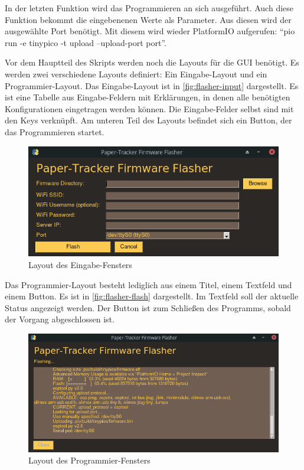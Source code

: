 In der letzten Funktion wird das Programmieren an sich ausgeführt.
Auch diese Funktion bekommt die eingebenenen Werte als Parameter. Aus diesen wird der ausgewählte Port benötigt.
Mit diesem wird wieder PlatformIO aufgerufen: \enquote{pio run -e tinypico -t upload --upload-port port}.

Vor dem Hauptteil des Skripts werden noch die Layouts für die \gls{GUI} benötigt.
Es werden zwei verschiedene Layouts definiert: Ein Eingabe-Layout und ein Programmier-Layout.
Das Eingabe-Layout ist in \autoref{fig:flasher-input} dargestellt.
Es ist eine Tabelle aus Eingabe-Feldern mit Erklärungen, in denen alle benötigten Konfigurationen eingetragen werden können.
Die Eingabe-Felder selbst sind mit den Keys verknüpft.
Am unteren Teil des Layouts befindet sich ein Button, der das Programmieren startet.

\begin{figure}[htbp]
	\includegraphics[width=\textwidth]{images/flasher/input.png}
	\centering
	\caption{Layout des Eingabe-Fensters}
	\label{fig:flasher-input}
\end{figure}

Das Programmier-Layout besteht lediglich aus einem Titel, einem Textfeld und einem Button.
Es ist in \autoref{fig:flasher-flash} dargestellt.
Im Textfeld soll der aktuelle Status angezeigt werden.
Der Button ist zum Schließen des Programms, sobald der Vorgang abgeschlossen ist.

\begin{figure}[htbp]
	\includegraphics[width=\textwidth]{images/flasher/flash.png}
	\centering
	\caption{Layout des Programmier-Fensters}
	\label{fig:flasher-flash}
\end{figure}

